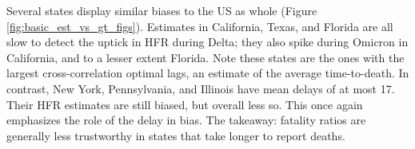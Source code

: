 \documentclass{article}
\begin{document}
Several states display similar biases to the US as whole (Figure
\ref{fig:basic_est_vs_gt_figs}). Estimates in California, Texas, and Florida are 
all slow to detect the uptick in HFR during Delta; they also spike during
Omicron in California, and to a lesser extent Florida. Note these states are the
ones with the largest cross-correlation optimal lags, an estimate of the average 
time-to-death. In contrast, New York, Pennsylvania, and Illinois have mean delays
of at most 17. Their HFR estimates are still biased, but overall less so. This
once again emphasizes the role of the delay in bias. The takeaway: fatality
ratios are generally less trustworthy in states that take longer to report
deaths.         



\end{document}
